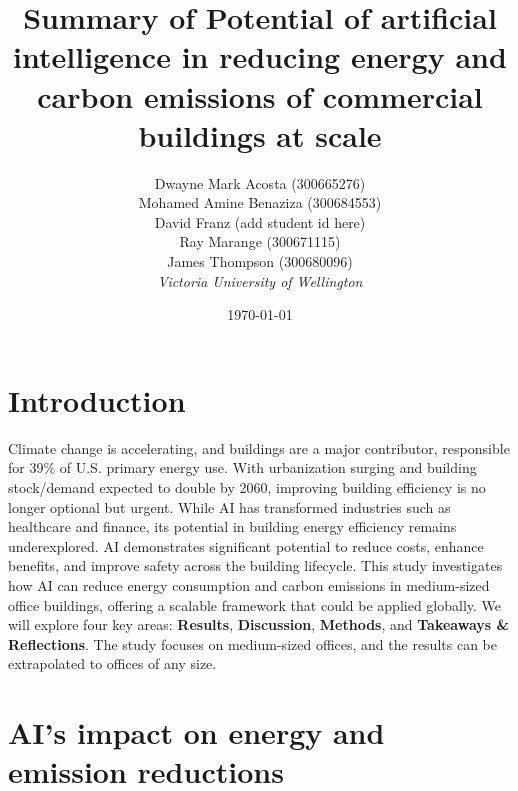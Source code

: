 \documentclass[conference,a4paper]{IEEEtran}
\begin{document}
\newcommand{\cfigure}[2]{%
  \begin{figure}[h]
    \centering
    \texttt{[image: figures/\#1.png]}%
    \caption{#2}%
    \label{fig:#1}%
  \end{figure}%

}
\title{Summary of Potential of artificial intelligence in reducing energy and carbon emissions of commercial buildings at scale}

\author{Dwayne Mark Acosta (300665276) \\ Mohamed Amine Benaziza (300684553) \\ David Franz (add student id here) \\ Ray Marange (300671115) \\ James Thompson (300680096)\\
\textit{Victoria University of Wellington}\\}
\date{\today}

\maketitle

\section*{Introduction}
Climate change is accelerating, and buildings are a major contributor, responsible for 39\% of U.S. primary energy use. With urbanization surging and building stock/demand expected to double by 2060, improving building efficiency is no longer optional but urgent.
While AI has transformed industries such as healthcare and finance, its potential in building energy efficiency remains underexplored. AI demonstrates significant potential to reduce costs, enhance benefits, and improve safety across the building lifecycle. This study \cite{dingPotentialArtificialIntelligence2024} investigates how AI can reduce energy consumption and carbon emissions in medium-sized office buildings, offering a scalable framework that could be applied globally.
We will explore four key areas: \textbf{Results}, \textbf{Discussion}, \textbf{Methods}, and \textbf{Takeaways \& Reflections}. The study focuses on medium-sized offices, and the results can be extrapolated to offices of any size.


\section*{AI's impact on energy and emission reductions}
\end{document}

